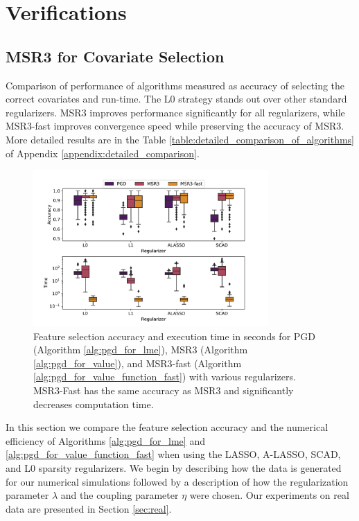 \section{Verifications}
\label{sec:applications}

\subsection{MSR3 for Covariate Selection}
\label{ch:sr3_l1}

\begin{table}
\centering

\caption{\label{table:comparison_of_algorithms} Comparison of performance of algorithms measured as accuracy of selecting the correct covariates and run-time. The L0 strategy stands out 
over other standard regularizers. MSR3 improves performance significantly for all regularizers, while MSR3-fast improves convergence speed while preserving the 
accuracy of MSR3.  
More detailed results are in the Table \ref{table:detailed_comparison_of_algorithms} of Appendix \ref{appendix:detailed_comparison}.}
\end{table}

\begin{figure}
    \centering
	\includegraphics[width=0.8\textwidth]{figures/benchmark}
	\caption{\label{fig:box_with_whiskers_for_synthetic_data}	Feature selection accuracy and execution time in seconds for PGD 
	(Algorithm \ref{alg:pgd_for_lme}), 
	MSR3 (Algorithm \ref{alg:pgd_for_value}), and MSR3-fast
	(Algorithm \ref{alg:pgd_for_value_function_fast}) with various regularizers. 
	MSR3-Fast has the same accuracy as 
	MSR3 and significantly decreases computation time.}
\end{figure}

In this section we compare
the feature selection accuracy and the numerical efficiency of Algorithms 
\ref{alg:pgd_for_lme} and 
\ref{alg:pgd_for_value_function_fast} when using the 
LASSO, A-LASSO, SCAD, and L0 sparsity regularizers.
We begin by describing how the data is generated for our numerical simulations 
followed by a description of how the  
regularization parameter $\lambda$ and the coupling parameter $\eta$  were chosen.
Our experiments on real data are presented in Section \ref{sec:real}.

